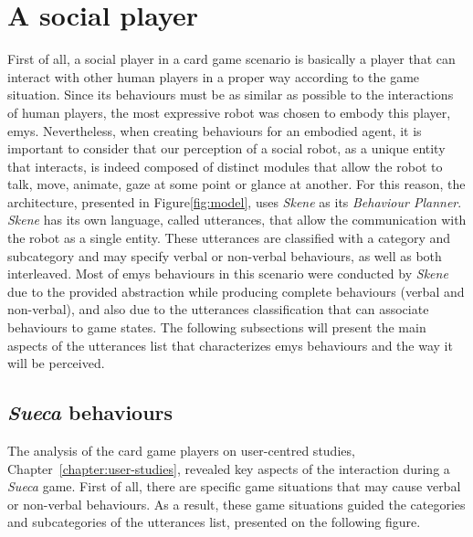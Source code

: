 \section{A social player}
\label{sec:social-player}

First of all, a social player in a card game scenario is basically a player that can interact with other human players in a proper way according to the game situation.
Since its behaviours must be as similar as possible to the interactions of human players, the most expressive robot was chosen to embody this player, \ac{emys}.
Nevertheless, when creating behaviours for an embodied agent, it is important to consider that our perception of a social robot, as a unique entity that interacts, is indeed composed of distinct modules that allow the robot to talk, move, animate, gaze at some point or glance at another.
For this reason, the architecture, presented in Figure\ref{fig:model}, uses \emph{Skene} as its \emph{Behaviour Planner}.
\emph{Skene} has its own language, called utterances, that allow the communication with the robot as a single entity.
These utterances are classified with a category and subcategory and may specify verbal or non-verbal behaviours, as well as both interleaved.
Most of \ac{emys} behaviours in this scenario were conducted by \emph{Skene} due to the provided abstraction while producing complete behaviours (verbal and non-verbal), and also due to the utterances classification that can associate behaviours to game states.
The following subsections will present the main aspects of the utterances list that characterizes \ac{emys} behaviours and the way it will be perceived.



\subsection{\emph{Sueca} behaviours}
The analysis of the card game players on user-centred studies, Chapter~\ref{chapter:user-studies}, revealed key aspects of the interaction during a \emph{Sueca} game.
First of all, there are specific game situations that may cause verbal or non-verbal behaviours.
As a result, these game situations guided the categories and subcategories of the utterances list, presented on the following figure.

